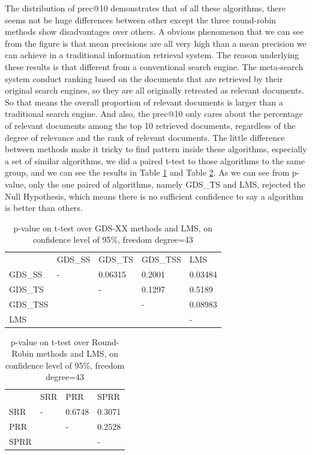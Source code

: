 The distribution of prec@10 demonstrates that of all these algorithms, there seems not be huge differences between other except the three round-robin methods show disadvantages over others. A obvious phenomenon that we can see from the figure is that mean precisions are all very high than a mean precision we can achieve in a traditional information retrieval system. The reason underlying these results is that different from a conventional search engine. The meta-search system conduct ranking based on the documents that are retrieved by their original search engines, so they are all originally retreated as relevant documents. So that means the overall proportion of relevant documents is larger than a traditional search engine. And also, the prec@10 only cares about the percentage of relevant documents among the top 10 retrieved documents, regardless of the degree of relevance and the rank of relevant documents. The little difference between methods make it tricky to find pattern inside these algorithms, especially a set of similar algorithms, we did a paired t-test to those algorithms to the same group, and we can see the results in Table \ref{tb:pvalue-gds} and Table \ref{tb:pvalue-RR}. As we can see from p-value, only the one paired of algorithms, namely GDS\_TS and LMS, rejected the Null Hypothesis, which means there is no sufficient confidence to say a algorithm is better than others.      

\begin{table}
\centering
\small
\begin{tabular}{lllll}
		&GDS\_SS&GDS\_TS&GDS\_TSS&LMS\\
		\cmidrule(lr){2-5}
GDS\_SS	&	-	&0.06315	&0.2001	&0.03484	\\
GDS\_TS	&		&	-	&0.1297	&0.5189	\\		
GDS\_TSS&		&		&	-	&0.08983	\\
LMS		&		&		&		&-\\
\end{tabular}
\footnotesize
\caption{p-value on t-test over GDS-XX methods and LMS, on confidence level of 95\%, freedom degree=43}
\label{tb:pvalue-gds}
\end{table}

\begin{table}
\centering
\small
\begin{tabular}{llll}
		&SRR&PRR&SPRR\\
		\cmidrule(lr){2-4}
SRR	&	-	&0.6748	&0.3071\\
PRR	&		&	-	&0.2528\\		
SPRR&		&		&	-\\
\end{tabular}
\footnotesize
\caption{p-value on t-test over Round-Robin methods and LMS, on confidence level of 95\%, freedom degree=43}
\label{tb:pvalue-RR}
\end{table}

